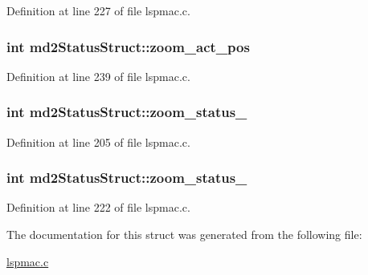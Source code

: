Definition at line 227 of file lspmac.c.\hypertarget{structmd2StatusStruct_a920b80e9f5f08aedac3ad541d5ffc8ae}{
\subsubsection[{zoom\_\-act\_\-pos}]{\setlength{\rightskip}{0pt plus 5cm}int {\bf md2StatusStruct::zoom\_\-act\_\-pos}}}
\label{structmd2StatusStruct_a920b80e9f5f08aedac3ad541d5ffc8ae}


Definition at line 239 of file lspmac.c.\hypertarget{structmd2StatusStruct_af28e978b761dc07eefed3971547cfd4d}{
\subsubsection[{zoom\_\-status\_\-1}]{\setlength{\rightskip}{0pt plus 5cm}int {\bf md2StatusStruct::zoom\_\-status\_}}}
\label{structmd2StatusStruct_af28e978b761dc07eefed3971547cfd4d}


Definition at line 205 of file lspmac.c.\hypertarget{structmd2StatusStruct_a34e4200315a083deb8a970e21bbbe277}{
\subsubsection[{zoom\_\-status\_\-2}]{\setlength{\rightskip}{0pt plus 5cm}int {\bf md2StatusStruct::zoom\_\-status\_}}}
\label{structmd2StatusStruct_a34e4200315a083deb8a970e21bbbe277}


Definition at line 222 of file lspmac.c.

The documentation for this struct was generated from the following file:\begin{DoxyCompactItemize}
\item 
\hyperlink{lspmac_8c}{lspmac.c}\end{DoxyCompactItemize}
